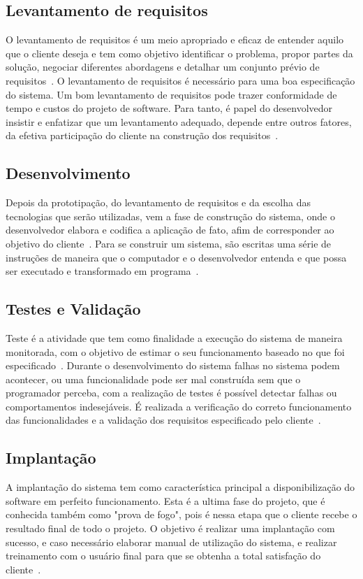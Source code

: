 \subsection{Levantamento de requisitos}
\indent

O levantamento de requisitos é um meio apropriado e eficaz de entender aquilo que o cliente deseja e tem como objetivo identificar o problema, propor partes da solução, negociar diferentes abordagens e detalhar um conjunto prévio de requisitos~\citep{pressmanengenharia}. 
O levantamento de requisitos é necessário para uma boa especificação do sistema.
Um bom levantamento de requisitos pode trazer conformidade de tempo e custos do projeto de software. Para tanto, é papel do desenvolvedor insistir e enfatizar que um levantamento adequado, depende entre outros fatores, da efetiva participação do cliente na construção dos requisitos~\citep{de2003engenharia}.

\subsection{Desenvolvimento}
\indent

Depois da prototipação, do levantamento de requisitos e da escolha das tecnologias que serão utilizadas, vem a fase de construção do sistema, onde o desenvolvedor elabora e codifica a aplicação de fato, afim de corresponder ao objetivo do cliente~\citep{pressman2016engenharia}. 
Para se construir um sistema, são escritas uma série de instruções de maneira que o computador e o desenvolvedor entenda e que possa ser executado e transformado em programa~\citep{ascencio2008fundamentos}.

\subsection{Testes e Validação}
\indent

Teste é a atividade que tem como finalidade a execução do sistema de maneira monitorada, com o objetivo de estimar o seu funcionamento baseado no que foi especificado~\citep{rios2006teste}.
Durante o desenvolvimento do sistema falhas no sistema podem acontecer, ou uma funcionalidade pode ser mal construída sem que o programador perceba, com a realização de testes é possível detectar falhas ou comportamentos indesejáveis. 
É realizada a verificação do correto funcionamento das funcionalidades e a validação dos requisitos especificado pelo cliente~\citep{costa2006estrategia}.


\subsection{Implantação}
\indent

A implantação do sistema tem como característica principal a disponibilização do software em perfeito funcionamento. 
Esta é a ultima fase do projeto, que é conhecida também como "prova de fogo", pois é nessa etapa que o cliente recebe o resultado final de todo o projeto. O objetivo é realizar uma implantação com sucesso, e caso necessário elaborar manual de utilização do sistema, e realizar treinamento com o usuário final para que se obtenha a total satisfação do cliente~\citep{rezende2006engenharia}.
